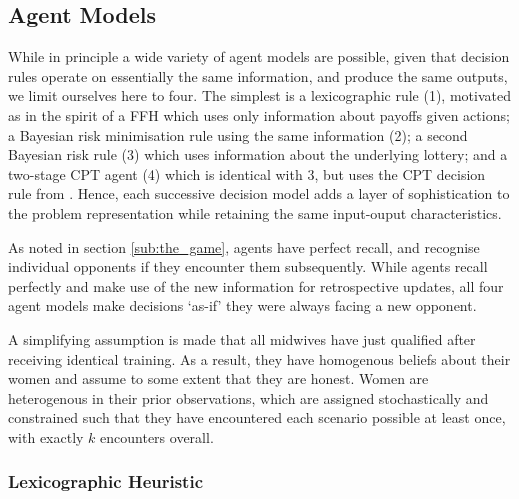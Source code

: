 \subsection{Agent Models}
\label{sub:the_agents}

While in principle a wide variety of agent models are possible, given that decision rules operate on essentially the same information, and produce the same outputs, we limit ourselves here to four. The simplest is a lexicographic rule (1), motivated as in the spirit of a \ac{FFH} \citep{Gigerenzer2004} which uses only information about payoffs given actions; a Bayesian risk minimisation rule using the same information (2); a second Bayesian risk rule (3) which uses information about the underlying lottery; and a two-stage \ac{CPT} \citep{Hau2008} agent (4) which is identical with 3, but uses the \ac{CPT} decision rule from \cite{Tversky1992}. Hence, each successive decision model adds a layer of sophistication to the problem representation while retaining the same input-ouput characteristics.

As noted in section \ref{sub:the_game}, agents have perfect recall, and recognise individual opponents if they encounter them subsequently. While agents recall perfectly and make use of the new information for retrospective updates, all four agent models make decisions `as-if' they were always facing a new opponent.

A simplifying assumption is made that all midwives have just qualified after receiving identical training. As a result, they have homogenous beliefs about their women and assume to some extent that they are honest.
Women are heterogenous in their prior observations, which are assigned stochastically and constrained such that they have encountered each scenario possible at least once, with exactly \(k\) encounters overall.


\subsubsection{Lexicographic Heuristic}
\label{sub:lexico}

